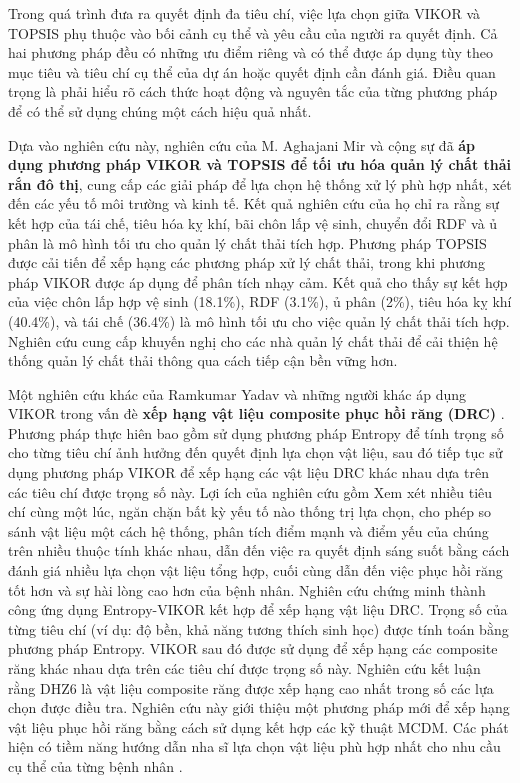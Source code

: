 Trong quá trình đưa ra quyết định đa tiêu chí, việc lựa chọn giữa VIKOR và TOPSIS phụ thuộc vào bối cảnh cụ thể và yêu cầu của người ra quyết định. Cả hai phương pháp đều có những ưu điểm riêng và có thể được áp dụng tùy theo mục tiêu và tiêu chí cụ thể của dự án hoặc quyết định cần đánh giá. Điều quan trọng là phải hiểu rõ cách thức hoạt động và nguyên tắc của từng phương pháp để có thể sử dụng chúng một cách hiệu quả nhất.

Dựa vào nghiên cứu này, nghiên cứu của M. Aghajani Mir và cộng sự đã \textbf{áp dụng phương pháp VIKOR và TOPSIS để tối ưu hóa quản lý chất thải rắn đô thị}, cung cấp các giải pháp để lựa chọn hệ thống xử lý phù hợp nhất, xét đến các yếu tố môi trường và kinh tế. Kết quả nghiên cứu của họ chỉ ra rằng sự kết hợp của tái chế, tiêu hóa kỵ khí, bãi chôn lấp vệ sinh, chuyển đổi RDF và ủ phân là mô hình tối ưu cho quản lý chất thải tích hợp. Phương pháp TOPSIS được cải tiến để xếp hạng các phương pháp xử lý chất thải, trong khi phương pháp VIKOR được áp dụng để phân tích nhạy cảm. Kết quả cho thấy sự kết hợp của việc chôn lấp hợp vệ sinh (18.1\%), RDF (3.1\%), ủ phân (2\%), tiêu hóa kỵ khí (40.4\%), và tái chế (36.4\%) là mô hình tối ưu cho việc quản lý chất thải tích hợp. Nghiên cứu cung cấp khuyến nghị cho các nhà quản lý chất thải để cải thiện hệ thống quản lý chất thải thông qua cách tiếp cận bền vững hơn.

Một nghiên cứu khác của Ramkumar Yadav và những người khác áp dụng VIKOR trong vấn đè \textbf{xếp hạng vật liệu composite phục hồi răng (DRC)} \cite{sciencedirect1}. Phương pháp thực hiên bao gồm sử dụng phương pháp Entropy để tính trọng số cho từng tiêu chí ảnh hưởng đến quyết định lựa chọn vật liệu, sau đó tiếp tục sử dụng phương pháp VIKOR để xếp hạng các vật liệu DRC khác nhau dựa trên các tiêu chí được trọng số này. Lợi ích của nghiên cứu gồm Xem xét nhiều tiêu chí cùng một lúc, ngăn chặn bất kỳ yếu tố nào thống trị lựa chọn, cho phép so sánh vật liệu một cách hệ thống, phân tích điểm mạnh và điểm yếu của chúng trên nhiều thuộc tính khác nhau, dẫn đến việc ra quyết định sáng suốt bằng cách đánh giá nhiều lựa chọn vật liệu tổng hợp, cuối cùng dẫn đến việc phục hồi răng tốt hơn và sự hài lòng cao hơn của bệnh nhân. Nghiên cứu chứng minh thành công ứng dụng Entropy-VIKOR kết hợp để xếp hạng vật liệu DRC. Trọng số của từng tiêu chí (ví dụ: độ bền, khả năng tương thích sinh học) được tính toán bằng phương pháp Entropy. VIKOR sau đó được sử dụng để xếp hạng các composite răng khác nhau dựa trên các tiêu chí được trọng số này. Nghiên cứu kết luận rằng DHZ6 là vật liệu composite răng được xếp hạng cao nhất trong số các lựa chọn được điều tra. Nghiên cứu này giới thiệu một phương pháp mới để xếp hạng vật liệu phục hồi răng bằng cách sử dụng kết hợp các kỹ thuật MCDM. Các phát hiện có tiềm năng hướng dẫn nha sĩ lựa chọn vật liệu phù hợp nhất cho nhu cầu cụ thể của từng bệnh nhân .

